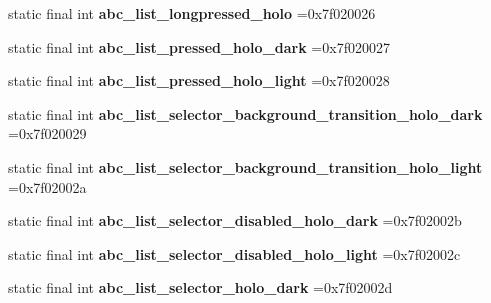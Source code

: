\begin{DoxyCompactItemize}
\item 
\hypertarget{classcheck_1_1test_1_1_r_1_1drawable_adf878aa9f88c41a687c357ee3eb59e9e}{}static final int {\bfseries abc\+\_\+list\+\_\+longpressed\+\_\+holo} =0x7f020026\label{classcheck_1_1test_1_1_r_1_1drawable_adf878aa9f88c41a687c357ee3eb59e9e}

\item 
\hypertarget{classcheck_1_1test_1_1_r_1_1drawable_a769d5ab0c59f6740cec4ad4c948b87fe}{}static final int {\bfseries abc\+\_\+list\+\_\+pressed\+\_\+holo\+\_\+dark} =0x7f020027\label{classcheck_1_1test_1_1_r_1_1drawable_a769d5ab0c59f6740cec4ad4c948b87fe}

\item 
\hypertarget{classcheck_1_1test_1_1_r_1_1drawable_ab377ea992d7e4a2f998767683738d739}{}static final int {\bfseries abc\+\_\+list\+\_\+pressed\+\_\+holo\+\_\+light} =0x7f020028\label{classcheck_1_1test_1_1_r_1_1drawable_ab377ea992d7e4a2f998767683738d739}

\item 
\hypertarget{classcheck_1_1test_1_1_r_1_1drawable_a9e95bb8294bd1622a243f95306d2d953}{}static final int {\bfseries abc\+\_\+list\+\_\+selector\+\_\+background\+\_\+transition\+\_\+holo\+\_\+dark} =0x7f020029\label{classcheck_1_1test_1_1_r_1_1drawable_a9e95bb8294bd1622a243f95306d2d953}

\item 
\hypertarget{classcheck_1_1test_1_1_r_1_1drawable_add702baa4d0dde6c259f94e8bf2eb8d4}{}static final int {\bfseries abc\+\_\+list\+\_\+selector\+\_\+background\+\_\+transition\+\_\+holo\+\_\+light} =0x7f02002a\label{classcheck_1_1test_1_1_r_1_1drawable_add702baa4d0dde6c259f94e8bf2eb8d4}

\item 
\hypertarget{classcheck_1_1test_1_1_r_1_1drawable_a7f6ba36382d5790501e6a40ac1efd966}{}static final int {\bfseries abc\+\_\+list\+\_\+selector\+\_\+disabled\+\_\+holo\+\_\+dark} =0x7f02002b\label{classcheck_1_1test_1_1_r_1_1drawable_a7f6ba36382d5790501e6a40ac1efd966}

\item 
\hypertarget{classcheck_1_1test_1_1_r_1_1drawable_ad2791b1b0627917ce6265c01b560a275}{}static final int {\bfseries abc\+\_\+list\+\_\+selector\+\_\+disabled\+\_\+holo\+\_\+light} =0x7f02002c\label{classcheck_1_1test_1_1_r_1_1drawable_ad2791b1b0627917ce6265c01b560a275}

\item 
\hypertarget{classcheck_1_1test_1_1_r_1_1drawable_aca26c53c5ec05a28cb7b91ccbfc14df7}{}static final int {\bfseries abc\+\_\+list\+\_\+selector\+\_\+holo\+\_\+dark} =0x7f02002d\label{classcheck_1_1test_1_1_r_1_1drawable_aca26c53c5ec05a28cb7b91ccbfc14df7}


\end{DoxyCompactItemize}
